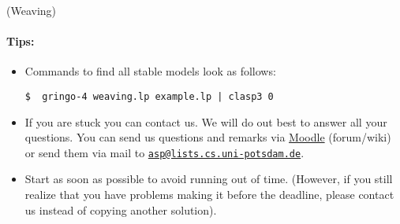 \documentclass[a4paper,12pt]{article}
\begin{document}
\begin{PraktikumsAufgabe}{2}{(Weaving)}
\paragraph{Tips:}
\begin{itemize}
\item Commands to find all stable models look as follows:%
\vspace{-1.5mm}%
\begin{verbatim}
$  gringo-4 weaving.lp example.lp | clasp3 0
\end{verbatim}
\vspace{-1mm}
\item If you are stuck you can contact us. We will do out best to answer all your questions.
      You can send us questions and remarks via 
      \href{http://moodle.cs.uni-potsdam.de/course/view.php?id=39}{Moodle} (forum/wiki)
      or send them via mail to 
      \href{mailto:asp@lists.cs.uni-potsdam.de}{\texttt{asp@lists.cs.uni-potsdam.de}}.
\item Start as soon as possible to avoid running out of time.
      (However, if you still realize that you have problems making it before the deadline,
       please contact us instead of copying another solution).
\end{itemize}

\end{PraktikumsAufgabe}
\end{document}
